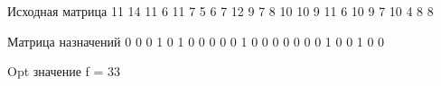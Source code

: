 Исходная матрица
   11   14   11    6   11
    7    5    6    7   12
    9    7    8   10   10
    9   11    6   10    9
    7   10    4    8    8

Матрица назначений
   0   0   0   1   0
   1   0   0   0   0
   0   1   0   0   0
   0   0   0   0   1
   0   0   1   0   0

Opt значение f = 33
